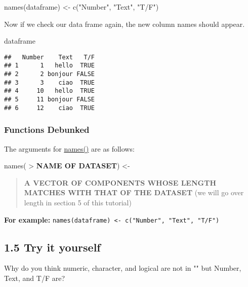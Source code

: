 \documentclass[
]{book}
\newenvironment{Shaded}{\begin{snugshade}}{\end{snugshade}}
\newcommand{\FunctionTok}[1]{\textcolor[rgb]{0.00,0.00,0.00}{#1}}
\newcommand{\NormalTok}[1]{#1}
\newcommand{\OtherTok}[1]{\textcolor[rgb]{0.56,0.35,0.01}{#1}}
\newcommand{\StringTok}[1]{\textcolor[rgb]{0.31,0.60,0.02}{#1}}
\begin{document}
\begin{Shaded}
\begin{Highlighting}[]
\FunctionTok{names}\NormalTok{(dataframe) }\OtherTok{\textless{}{-}} \FunctionTok{c}\NormalTok{(}\StringTok{"Number"}\NormalTok{, }\StringTok{"Text"}\NormalTok{, }\StringTok{"T/F"}\NormalTok{)}
\end{Highlighting}
\end{Shaded}

Now if we check our data frame again, the new column names should appear.

\begin{Shaded}
\begin{Highlighting}[]
\NormalTok{dataframe}
\end{Highlighting}
\end{Shaded}

\begin{verbatim}
##   Number    Text   T/F
## 1      1   hello  TRUE
## 2      2 bonjour FALSE
## 3      3    ciao  TRUE
## 4     10   hello  TRUE
## 5     11 bonjour FALSE
## 6     12    ciao  TRUE
\end{verbatim}

\hypertarget{functions-debunked-3}{%
\subsubsection{Functions Debunked}\label{functions-debunked-3}}

The arguments for \href{https://www.rdocumentation.org/packages/base/versions/3.6.2/topics/names}{names()} are as follows:

names(
\textgreater{} \textbf{NAME OF DATASET}) \textless-

\begin{quote}
\textbf{A VECTOR OF COMPONENTS WHOSE LENGTH MATCHES WITH THAT OF THE DATASET} (we will go over length in section 5 of this tutorial)
\end{quote}

\textbf{For example:} \texttt{names(dataframe)\ \textless{}-\ c("Number",\ "Text",\ "T/F")}

\hypertarget{try-it-yourself-4}{%
\subsection{1.5 Try it yourself}\label{try-it-yourself-4}}

Why do you think numeric, character, and logical are not in "" but Number, Text, and T/F are?
\end{document}

